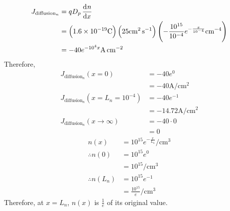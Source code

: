 \documentclass[fleqn, a4paper, 11pt, oneside]{amsart}
\theoremstyle{definition}
\theoremstyle{theorem}
\begin{document}
\begin{solution}
\begin{enumerate}[leftmargin=*]
			\begin{align*}
				J_{\text{diffusion}_n} &= q D_p \dod{n}{x}\\
				&= \left( 1.6 \times 10^{-19} \si{\coulomb} \right) \left( 25 \si{\centi\metre\squared\per\second} \right) \left( -\frac{10^{15}}{10^{-4}} e^{-\frac{x}{10^{-4}}} \si{\per\centi\metre\tothe{4}} \right)\\
				&= -40 e^{-10^4 x} \si{\ampere\per\centi\metre\squared}
			\end{align*}
			Therefore,
			\begin{align*}
				J_{\text{diffusion}_n}(x = 0) &= -40 e^{0}\\
				&= -40 \si{\ampere\per\centi\metre\squared}\\
				J_{\text{diffusion}_n}(x = L_n = 10^{-4}) &= -40 e^{-1}\\
				&= -14.72 \si{\ampere\per\centi\metre\squared}\\
				J_{\text{diffusion}_n}(x \to \infty) &= -40 \cdot 0\\
				&= 0
			\end{align*}
			\begin{align*}
				n(x) &= 10^{15} e^{-\frac{x}{L_n}} \si{\per\centi\metre\cubed}\\
				\therefore n(0) &= 10^{15} e^{0}\\
				&= 10^{15} \si{\per\centi\metre\cubed}\\
				\therefore n(L_n) &= 10^{15} e^{-1}\\
				&= \frac{10^{15}}{e} \si{\per\centi\metre\cubed}
			\end{align*}
			Therefore, at $x = L_n$, $n(x)$ is $\frac{1}{e}$ of its original value.
	\end{enumerate}
\end{solution}
\end{document}
